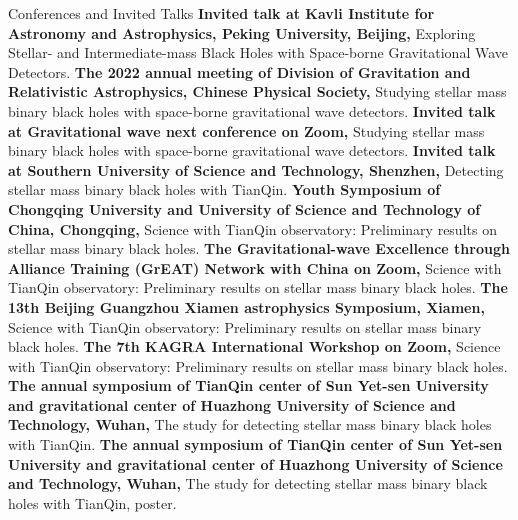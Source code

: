 
\begin{rubric}{Conferences and Invited Talks}
    \entry*[2023] \textbf{Invited talk at Kavli Institute for Astronomy and Astrophysics, Peking University, Beijing,} Exploring Stellar- and Intermediate-mass Black Holes with Space-borne Gravitational Wave Detectors.
    \entry*[2022] \textbf{The 2022 annual meeting of Division of Gravitation and Relativistic Astrophysics, Chinese Physical Society,} Studying stellar mass binary black holes with space-borne gravitational wave detectors.
    \entry*[2022] \textbf{Invited talk at Gravitational wave next conference on Zoom,} Studying stellar mass
    binary black holes with space-borne gravitational wave detectors.
    \entry*[2022] \textbf{Invited talk at Southern University of Science and Technology, Shenzhen,} Detecting stellar mass
    binary black holes with TianQin. 
    \entry*[2021] \textbf{Youth Symposium of Chongqing University and University of Science and Technology of China,
    Chongqing,} Science with TianQin observatory: Preliminary results on stellar mass binary black holes.
    \entry*[2021] \textbf{The Gravitational-wave Excellence through Alliance Training (GrEAT) Network with China on
    Zoom,} Science with TianQin observatory: Preliminary results on stellar mass binary black holes.
    \entry*[2020] \textbf{The 13th Beijing Guangzhou Xiamen astrophysics Symposium, Xiamen,} Science with
    TianQin observatory: Preliminary results on stellar mass binary black holes.
    \entry*[2020] \textbf{The 7th KAGRA International Workshop on Zoom,} Science with
    TianQin observatory: Preliminary results on stellar mass binary black holes.
    \entry*[2019] \textbf{The annual symposium of TianQin center of Sun Yet-sen University and gravitational center of
    Huazhong University of Science and Technology,
    Wuhan,} The study for detecting stellar mass binary black holes with TianQin. 
    \entry*[2018] \textbf{The annual symposium of TianQin center of Sun Yet-sen University and gravitational center of
    Huazhong University of Science and Technology,
    Wuhan,} The study for detecting stellar mass binary black holes with TianQin, poster.
\end{rubric}
